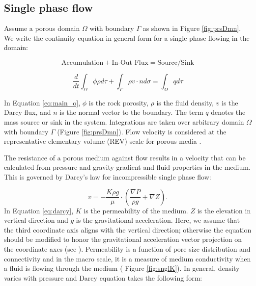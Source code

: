 \subsection{Single phase flow}

Assume a porous domain $\Omega$ with boundary $\Gamma$ as shown in Figure
\ref{fig:prsDmn}. We write the continuity equation in general form for a single
phase flowing in the domain:

\begin{equation}
  \mbox{Accumulation}+\mbox{In-Out Flux} = \mbox{Source/Sink}
  \label{eq:ak}
\end{equation}

\begin{equation}
  \frac{d}{dt}\int_{\Omega}\phi\rho d\tau+\int_{\Gamma}\rho v
\cdot n d\sigma=\int_{\Omega}qd\tau
  \label{eq:main_o}
\end{equation}

In Equation \ref{eq:main_o}, $\phi$ is the rock porosity, $\rho$ is the fluid
density, $v$ is the Darcy flux, and $n$ is the normal vector to the boundary.
The term $q$ denotes the mass source or sink in the system. Integrations are
taken over arbitrary domain $\Omega$ with boundary $\Gamma$ (Figure
\ref{fig:prsDmn}). Flow velocity is considered at the representative elementary
volume (REV) scale for porous media \cite{bear1988dynamics}.

The resistance of a porous medium against flow results in a velocity that can be
calculated from pressure and gravity gradient and fluid properties in the
medium.
This is governed by Darcy's law for incompressible single phase flow:
 
\begin{equation}
  v=-\frac{K\rho g}{\mu}\cdot (\frac{\nabla{P}}{\rho g}+\nabla{Z}).
  \label{eq:darcy}
\end{equation} In Equation \ref{eq:darcy}, $K$ is the permeability of the
medium. $Z$ is the elevation in vertical direction and $g$ is the gravitational acceleration. Here, we assume that the third coordinate axis aligns with the vertical direction; otherwise the equation should be modified to honor the gravitational acceleration vector projection on the coordinate axes (see \cite{celia2011geological}). Permeability is a function of pore size distribution and connectivity and in the macro scale, it is a measure of medium conductivity when a fluid is flowing
through the medium ( Figure \ref{fig:snglK}). In general, density varies with pressure and Darcy equation takes the following form:

